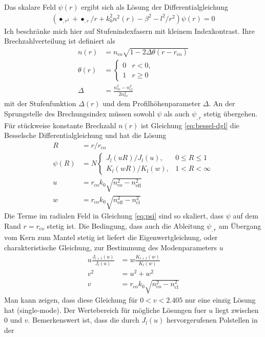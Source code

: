 \documentclass[DIV19,twocolumn]{scrartcl}
\def\({\left(}
\def\){\right)}
\newcommand{\nco}{n_\textrm{co}}
\newcommand{\rco}{r_\textrm{co}}
\newcommand{\neff}{n_\textrm{eff}}
\newcommand{\ncl}{n_\textrm{cl}}
\begin{document}
Das skalare Feld $\psi(r)$ ergibt sich als L\"osung der Differentialgleichung
\begin{align}
\label{eq:bessel-dgl}
\(\bullet_{,r^2} + \bullet_{,r}/r +k_0^2 n^2(r) -\beta^2 -l^2/r^2\)\psi(r) = 0
\end{align}
Ich beschr\"anke mich hier auf Stufenindexfasern mit kleinem
Indexkontrast. Ihre Brechzahlverteilung ist definiert als
\begin{align}
n(r)&=\nco\sqrt{1-2\Delta\theta(r-\rco)} \\
\theta(r)&=\begin{cases}0 &r<0,\\ 1 & r\ge 0\end{cases} \\
\Delta &= \frac{\nco^2-\ncl^2}{2\nco^2}
\end{align}
mit der Stufenfunktion $\Delta(r)$ und dem Profilh\"ohenparameter
$\Delta$. An der Sprungstelle des Brechungsindex m\"ussen sowohl
$\psi$ als auch $\psi_{,r}$ stetig \"ubergehen. F\"ur st\"uckweise konstante Brechzahl $n(r)$ ist Gleichung \eqref{eq:bessel-dgl} die Besselsche Differentialgleichung und hat die L\"osung
\begin{align}
  R&=r/\rco\\
  \psi(R)&=N\begin{cases}
  J_l(uR)/J_l(u), & 0\le R\le 1\\
  K_l(wR)/K_l(w), & 1<R<\infty 
  \end{cases}\label{eq:psi}\\
  u &= \rco k_0 \sqrt{\nco^2-\neff^2} \\
  w &= \rco k_0 \sqrt{\neff^2-\ncl^2} 
\end{align}
Die Terme im radialen Feld in Gleichung \eqref{eq:psi} sind so
skaliert, dass $\psi$ auf dem Rand $r=\rco$ stetig ist. Die Bedingung,
dass auch die Ableitung $\psi_{,r}$ am \"Ubergang vom Kern zum Mantel
stetig ist liefert die Eigenwertgleichung, oder charakteristische
Gleichung, zur Bestimmung des Modenparameters $u$
\begin{align}
  u\frac{J_{l+1}(u)}{J_l(u)}&=w\frac{K_{l+1}(w)}{K_l(w)}\\
  v^2 &= u^2+w^2\\
  v &= \rco k_0 \sqrt{\nco^2-\ncl^2}
\end{align}
Man kann zeigen, dass diese Gleichung f\"ur $0<v<2.405$ nur eine
einzig L\"osung hat (single-mode). Der Wertebereich f\"ur m\"ogliche
L\"osungen fuer $u$ liegt zwischen 0 und $v$. Bemerkenswert ist, dass
die durch $J_l(u)$ hervorgerufenen Polstellen in der
\end{document}
